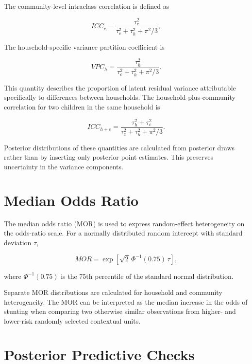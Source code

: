 The community-level intraclass correlation is defined as

\begin{equation}
ICC_c =
\frac{\tau_c^2}
{\tau_c^2 + \tau_h^2 + \pi^2/3},
\end{equation}

The household-specific variance partition coefficient is

\begin{equation}
VPC_h =
\frac{\tau_h^2}
{\tau_c^2 + \tau_h^2 + \pi^2/3}.
\end{equation}

This quantity describes the proportion of latent residual variance attributable specifically to differences between households. The household-plus-community correlation for two children in the same household is

\begin{equation}
ICC_{h+c} =
\frac{\tau_h^2 + \tau_c^2}
{\tau_c^2 + \tau_h^2 + \pi^2/3}.
\end{equation}

Posterior distributions of these quantities are calculated from posterior draws rather than by inserting only posterior point estimates. This preserves uncertainty in the variance components.

\section{Median Odds Ratio}

The median odds ratio (MOR) is used to express random-effect heterogeneity on the odds-ratio scale. For a normally distributed random intercept with standard deviation $\tau$,

\begin{equation}
MOR =
\exp\left[
\sqrt{2}\,
\Phi^{-1}(0.75)\,
\tau
\right],
\end{equation}

where $\Phi^{-1}(0.75)$ is the 75th percentile of the standard normal distribution.

Separate MOR distributions are calculated for household and community heterogeneity. The MOR can be interpreted as the median increase in the odds of stunting when comparing two otherwise similar observations from higher- and lower-risk randomly selected contextual units.

\section{Posterior Predictive Checks}

